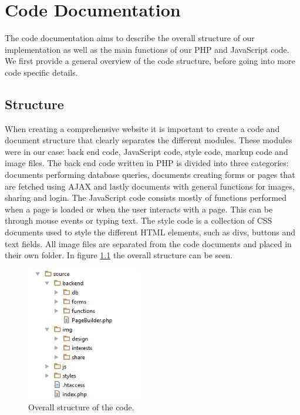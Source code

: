 \chapter{Code Documentation}
\label{apx:Code}

The code documentation aims to describe the overall structure of our implementation as well as the main functions of our PHP and JavaScript code. We first provide a general overview of the code structure, before going into more code specific details. 

\section{Structure}
\label{sec:CodeStructure}
When creating a comprehensive website it is important to create a code and document structure that clearly separates the different modules. These modules were in our case: back end code, JavaScript code, style code, markup code and image files. The back end code written in PHP is divided into three categories: documents performing database queries, documents creating forms or pages that are fetched using AJAX and lastly documents with general functions for images, sharing and login. The JavaScript code consists mostly of functions performed when a page is loaded or when the user interacts with a page. This can be through mouse events or typing text. The style code is a collection of CSS documents used to style the different HTML elements, such as divs, buttons and text fields. All image files are separated from the code documents and placed in their own folder. In figure \ref{fig:CodeStructureStruc} the overall structure can be seen.

\begin{figure}[ht!]
  \centering
  \includegraphics[width=50mm]{./Appendix/CodeDocumentation/img/structure}
  \caption{Overall structure of the code.}
  \label{fig:CodeStructureStruc}
\end{figure}

